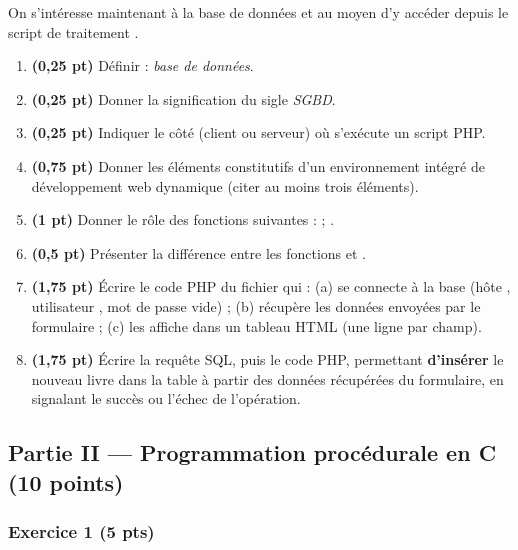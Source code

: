 \noindent On s'intéresse maintenant à la base de données  et au
moyen d'y accéder depuis le script de traitement .

\begin{enumerate}[label=\textbf{\arabic*.}]
\item \textbf{(0,25 pt)} Définir : \emph{base de données}.
\item \textbf{(0,25 pt)} Donner la signification du sigle \emph{SGBD}.
\item \textbf{(0,25 pt)} Indiquer le côté (client ou serveur) où s'exécute un
script PHP.
\item \textbf{(0,75 pt)} Donner les éléments constitutifs d'un environnement
intégré de développement web dynamique (citer au moins trois éléments).
\item \textbf{(1 pt)} Donner le rôle des fonctions suivantes :
 ; .
\item \textbf{(0,5 pt)} Présenter la différence entre les fonctions
 et .
\item \textbf{(1,75 pt)} Écrire le code PHP du fichier 
qui : (a) se connecte à la base  (hôte ,
utilisateur , mot de passe vide) ; (b) récupère les données envoyées
par le formulaire ; (c) les affiche dans un tableau HTML (une ligne par champ).
\item \textbf{(1,75 pt)} Écrire la requête SQL, puis le code PHP, permettant
\textbf{d'insérer} le nouveau livre dans la table  à partir des
données récupérées du formulaire, en signalant le succès ou l'échec de
l'opération.
\end{enumerate}

\subsection*{Partie II — Programmation procédurale en C \hfill (10 points)}

\subsubsection*{Exercice 1 \hfill (5 pts)}

